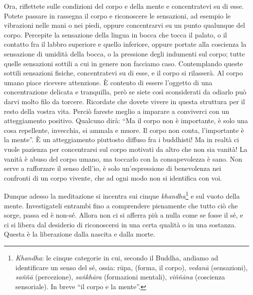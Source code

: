 Ora, riflettete sulle condizioni del corpo e della mente e concentratevi
su di esse. Potete passare in rassegna il corpo e riconoscere le
sensazioni, ad esempio le vibrazioni nelle mani o nei piedi, oppure
concentrarvi su un punto qualunque del corpo. Percepite la sensazione
della lingua in bocca che tocca il palato, o il contatto fra il labbro
superiore e quello inferiore, oppure portate alla coscienza la
sensazione di umidità della bocca, o la pressione degli indumenti sul
corpo; tutte quelle sensazioni sottili a cui in genere non facciamo
caso. Contemplando queste sottili sensazioni fisiche, concentratevi su
di esse, e il corpo si rilasserà. Al corpo umano piace ricevere
attenzione. È contento di essere l'oggetto di una concentrazione
delicata e tranquilla, però se siete così sconsiderati da odiarlo può
darvi molto filo da torcere. Ricordate che dovete vivere in questa
struttura per il resto della vostra vita. Perciò fareste meglio a
imparare a conviverci con un atteggiamento positivo. Qualcuno dirà: ``Ma
il corpo non è importante, è solo una cosa repellente, invecchia, si
ammala e muore. Il corpo non conta, l'importante è la mente''. È un
atteggiamento piuttosto diffuso fra i buddhisti! Ma in realtà ci vuole
pazienza per concentrarsi sul corpo motivati da altro che non sia vanità!
La vanità è abuso del corpo umano, ma toccarlo con la consapevolezza è
sano. Non serve a rafforzare il senso dell'io, è solo un'espressione di
benevolenza nei confronti di un corpo vivente, che ad ogni modo non si
identifica con voi.

Dunque adesso la meditazione si incentra sui cinque \textit{khandha}\footnote{\textit{Khandha}: le cinque categorie in cui, secondo il Buddha,
andiamo ad identificare un senso del sé, ossia: rūpa, (forma, il corpo),
\textit{vedanā} (sensazioni), \textit{saññā} (percezione), \textit{saṅkhāra} (formazioni mentali),
\textit{viññāna} (coscienza sensoriale). In breve ``il corpo e la mente''.} e
sul vuoto della mente. Investigateli entrambi fino a comprendere
pienamente che tutto ciò che sorge, passa ed è non-sé. Allora non ci si
afferra più a nulla come se fosse il sé, e ci si libera dal desiderio di
riconoscersi in una certa qualità o in una sostanza. Questa è la
liberazione dalla nascita e dalla morte.

